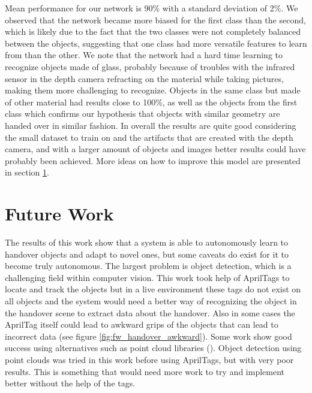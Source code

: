 Mean performance for our network is 90\% with a standard deviation of 2\%. We observed that the network became more biased for the first class than the second, which is likely due to the fact that the two classes were not completely balanced between the objects, suggesting that one class had more versatile features to learn from than the other. We note that the network had a hard time learning to recognize objects made of glass, probably because of troubles with the infrared sensor in the depth camera refracting on the material while taking pictures, making them more challenging to recognize. Objects in the same class but made of other material had results close to 100\%, as well as the objects from the first class which confirms our hypothesis that objects with similar geometry are handed over in similar fashion. In overall the results are quite good considering the small dataset to train on and the artifacts that are created with the depth camera, and with a larger amount of objects and images better results could have probably been achieved. More ideas on how to improve this model are presented in section \ref{sec:future-work}.

\section{Future Work}
\label{sec:future-work}

The results of this work show that a system is able to autonomously learn to handover objects and adapt to novel ones, but some caveats do exist for it to become truly autonomous. The largest problem is object detection, which is a challenging field within computer vision. This work took help of AprilTags to locate and track the objects but in a live environment these tags do not exist on all objects and the system would need a better way of recognizing the object in the handover scene to extract data about the handover. Also in some cases the AprilTag itself could lead to awkward grips of the objects that can lead to incorrect data (see figure \ref{fig:fw_handover_awkward}). Some work show good success using alternatives such as point cloud libraries (\parencite{Chan2015a}). Object detection using point clouds was tried in this work before using AprilTags, but with very poor results. This is something that would need more work to try and implement better without the help of the tags.


